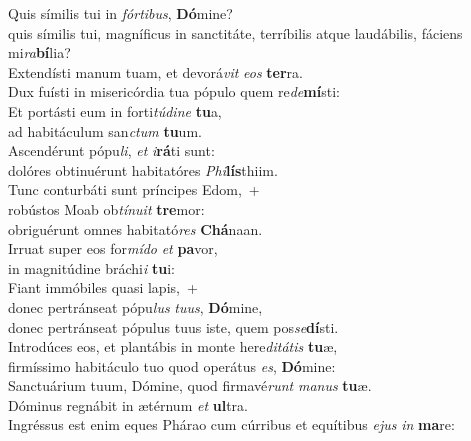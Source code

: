 \evenverse Quis símilis tui in \textit{fór}\textit{ti}\textit{bus}, \textbf{Dó}mine?~\*\\
\evenverse quis símilis tui, magníficus in sanctitáte, terríbilis atque laudábilis, fáciens mi\textit{ra}\textbf{bí}lia?\\
\oddverse Extendísti manum tuam, et devorá\textit{vit} \textit{e}\textit{os} \textbf{ter}ra.~\*\\
\oddverse Dux fuísti in misericórdia tua pópulo quem re\textit{de}\textbf{mí}sti:\\
\evenverse Et portásti eum in forti\textit{tú}\textit{di}\textit{ne} \textbf{tu}a,~\*\\
\evenverse ad habitáculum san\textit{ctum} \textbf{tu}um.\\
\oddverse Ascendérunt pópu\textit{li}, \textit{et} \textit{i}\textbf{rá}ti sunt:~\*\\
\oddverse dolóres obtinuérunt habitatóres \textit{Phi}\textbf{lís}thiim.\\
\evenverse Tunc conturbáti sunt príncipes Edom,~+\\
\evenverse  robústos Moab ob\textit{tí}\textit{nu}\textit{it} \textbf{tre}mor:~\*\\
\evenverse obriguérunt omnes habitató\textit{res} \textbf{Chá}naan.\\
\oddverse Irruat super eos for\textit{mí}\textit{do} \textit{et} \textbf{pa}vor,~\*\\
\oddverse in magnitúdine bráchi\textit{i} \textbf{tu}i:\\
\evenverse Fiant immóbiles quasi lapis,~+\\
\evenverse  donec pertránseat pópu\textit{lus} \textit{tu}\textit{us}, \textbf{Dó}mine,~\*\\
\evenverse donec pertránseat pópulus tuus iste, quem pos\textit{se}\textbf{dí}sti.\\
\oddverse Introdúces eos, et plantábis in monte here\textit{di}\textit{tá}\textit{tis} \textbf{tu}æ,~\*\\
\oddverse firmíssimo habitáculo tuo quod operátus \textit{es}, \textbf{Dó}mine:\\
\evenverse Sanctuárium tuum, Dómine, quod firmavé\textit{runt} \textit{ma}\textit{nus} \textbf{tu}æ.~\*\\
\evenverse Dóminus regnábit in ætérnum \textit{et} \textbf{ul}tra.\\
\oddverse Ingréssus est enim eques Phárao cum cúrribus et equítibus \textit{e}\textit{jus} \textit{in} \textbf{ma}re:~\*\\
